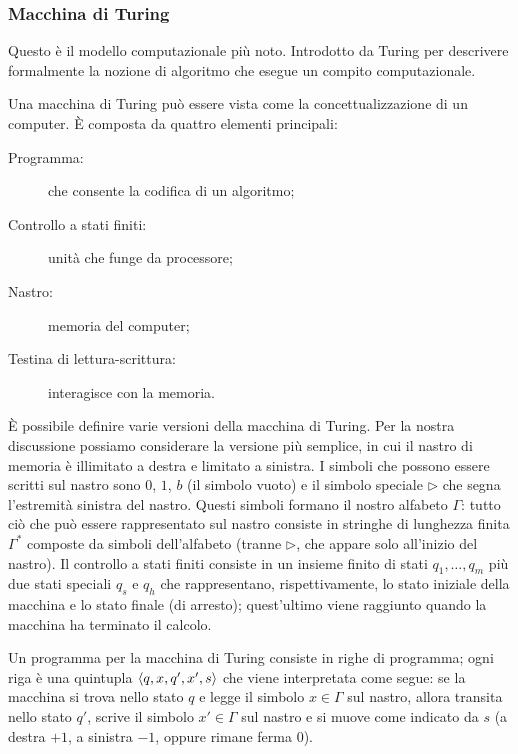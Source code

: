 \subsubsection*{Macchina di Turing}
Questo è il modello computazionale più noto. Introdotto da Turing per descrivere formalmente la nozione di algoritmo che esegue un compito computazionale.

Una macchina di Turing può essere vista come la concettualizzazione di un computer. È composta da quattro elementi principali:
\begin{description}
	\item[Programma:] che consente la codifica di un algoritmo;
	\item[Controllo a stati finiti:] unità che funge da processore;
	\item[Nastro:] memoria del computer;
	\item[Testina di lettura-scrittura:] interagisce con la memoria.
\end{description} 

È possibile definire varie versioni della macchina di Turing. Per la nostra discussione possiamo considerare la versione più semplice, in cui il nastro di memoria è illimitato a destra e limitato a sinistra. I simboli che possono essere scritti sul nastro sono $0$, $1$, $b$ (il simbolo vuoto) e il simbolo speciale $\triangleright$ che segna l'estremità sinistra del nastro. Questi simboli formano il nostro alfabeto $\Gamma$: tutto ciò che può essere rappresentato sul nastro consiste in stringhe di lunghezza finita $\Gamma^*$ composte da simboli dell'alfabeto (tranne $\triangleright$, che appare solo all'inizio del nastro). Il controllo a stati finiti consiste in un insieme finito di stati $q_1, \dots, q_m$ più due stati speciali $q_s$ e $q_h$ che rappresentano, rispettivamente, lo stato iniziale della macchina e lo stato finale (di arresto); quest'ultimo viene raggiunto quando la macchina ha terminato il calcolo. 

Un programma per la macchina di Turing consiste in righe di programma; ogni riga è una quintupla $\braket{q, x, q', x', s}$ che viene interpretata come segue: se la macchina si trova nello stato $q$ e legge il simbolo $x \in \Gamma$ sul nastro, allora transita nello stato $q'$, scrive il simbolo $x' \in \Gamma$ sul nastro e si muove come indicato da $s$ (a destra $+1$, a sinistra $-1$, oppure rimane ferma $0$).

